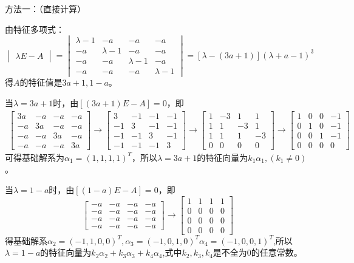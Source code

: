 \documentclass{article}
\begin{document}
\begin{jie}
方法一：（直接计算）

由特征多项式：
\begin{equation*}
  \begin{vmatrix}
\lambda E-A
  \end{vmatrix}
  =\begin{vmatrix}
     \lambda-1 & -a& -a& -a \\
     -a& \lambda-1& -a& -a\\
     -a& -a& \lambda-1& -a\\
     -a& -a& -a& \lambda-1
   \end{vmatrix}=\left[\lambda-(3a+1)\right]\left(\lambda+a-1\right)^{3}
\end{equation*}
得$A$的特征值是$3a+1,1-a$。

当$\lambda=3a+1$时，由$[(3a+1)E-A]=0$，即
\begin{align*}
\begin{bmatrix}
3a & -a& -a& -a \\
-a& 3a& -a& -a\\
-a& -a& 3a& -a\\
-a& -a& -a& 3a
\end{bmatrix}\rightarrow
\begin{bmatrix}
3 & -1& -1& -1 \\
-1& 3& -1& -1\\
-1& -1& 3& -1\\
-1& -1& -1& 3
\end{bmatrix}\rightarrow
\begin{bmatrix}
1 & -3& 1& 1 \\
1& 1& -3& 1\\
1& 1& 1& -3\\
0&0& 0& 0
\end{bmatrix}\rightarrow
\begin{bmatrix}
1 & 0& 0& -1 \\
0& 1& 0& -1\\
0& 0& 1& -1\\
0&0& 0& 0
\end{bmatrix}
\end{align*}
可得基础解系为$\alpha_{1}=(1,1,1,1)^T$，所以$\lambda=3a+1$的特征向量为$k_{1}\alpha_1,(k_1\neq 0)$。

当$\lambda=1-a$时，由$[(1-a)E-A]=0$，即
\begin{equation*}
  \begin{bmatrix}
-a & -a & -a& -a\\
-a & -a & -a& -a\\
-a & -a & -a& -a\\
-a & -a & -a& -a
  \end{bmatrix}\rightarrow
  \begin{bmatrix}
    1 & 1 & 1& 1\\
    0 & 0& 0& 0\\
    0 & 0& 0& 0\\
    0 & 0& 0& 0
  \end{bmatrix}
\end{equation*}
得基础解系$\alpha_2=(-1,1,0,0)^T,\alpha_3=(-1,0,1,0)^T\alpha_4=(-1,0,0,1)^T$,所以$\lambda=1-a$的特征向量为$k_2\alpha_2+k_3\alpha_3+k_4\alpha_4$,式中$k_2,k_3,k_4$是不全为0的任意常数。


\end{jie}
\end{document}
